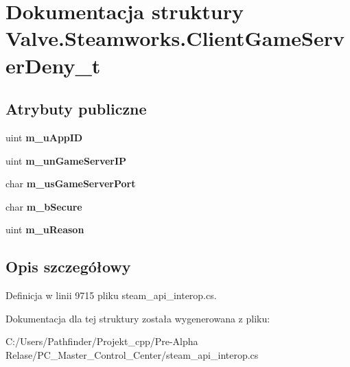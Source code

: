 \hypertarget{struct_valve_1_1_steamworks_1_1_client_game_server_deny__t}{}\section{Dokumentacja struktury Valve.\+Steamworks.\+Client\+Game\+Server\+Deny\+\_\+t}
\label{struct_valve_1_1_steamworks_1_1_client_game_server_deny__t}
\subsection*{Atrybuty publiczne}
\begin{DoxyCompactItemize}
\item 
\mbox{\label{struct_valve_1_1_steamworks_1_1_client_game_server_deny__t_a225a979afb6b3c5de243220fd6c79eac}} 
uint {\bfseries m\+\_\+u\+App\+ID}
\item 
\mbox{\label{struct_valve_1_1_steamworks_1_1_client_game_server_deny__t_a16353b0d7eeaddeb522d09170520b92d}} 
uint {\bfseries m\+\_\+un\+Game\+Server\+IP}
\item 
\mbox{\label{struct_valve_1_1_steamworks_1_1_client_game_server_deny__t_a243832bb2fead080dc1ffc896301dde8}} 
char {\bfseries m\+\_\+us\+Game\+Server\+Port}
\item 
\mbox{\label{struct_valve_1_1_steamworks_1_1_client_game_server_deny__t_a861e0d9b642c9d39e13b453a9d63c3ca}} 
char {\bfseries m\+\_\+b\+Secure}
\item 
\mbox{\label{struct_valve_1_1_steamworks_1_1_client_game_server_deny__t_aa51ec371f8c0600c572063cc5dc523cc}} 
uint {\bfseries m\+\_\+u\+Reason}
\end{DoxyCompactItemize}


\subsection{Opis szczegółowy}


Definicja w linii 9715 pliku steam\+\_\+api\+\_\+interop.\+cs.



Dokumentacja dla tej struktury została wygenerowana z pliku\+:\begin{DoxyCompactItemize}
\item 
C\+:/\+Users/\+Pathfinder/\+Projekt\+\_\+cpp/\+Pre-\/\+Alpha Relase/\+P\+C\+\_\+\+Master\+\_\+\+Control\+\_\+\+Center/steam\+\_\+api\+\_\+interop.\+cs\end{DoxyCompactItemize}
